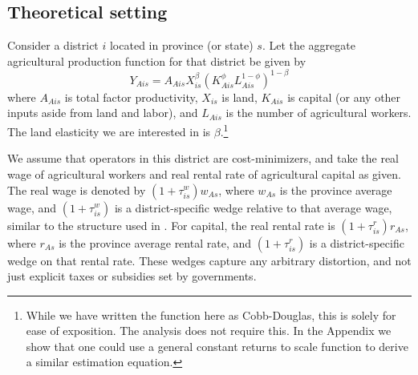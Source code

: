 \subsection{Theoretical setting}
Consider a district $i$ located in province (or state) $s$. Let the aggregate agricultural production function for that district be given by
\begin{equation}
Y_{Ais} = A_{Ais} X_{is}^{\beta} \left(K_{Ais}^{\phi}L_{Ais}^{1-\phi}\right)^{1-\beta} \label{EQ_production}
\end{equation}
where $A_{Ais}$ is total factor productivity, $X_{is}$ is land, $K_{Ais}$ is capital (or any other inputs aside from land and labor), and $L_{Ais}$ is the number of agricultural workers. The land elasticity we are interested in is $\beta$.\footnote{While we have written the function here as Cobb-Douglas, this is solely for ease of exposition. The analysis does not require this. In the Appendix we show that one could use a general constant returns to scale function to derive a similar estimation equation.}

We assume that operators in this district are cost-minimizers, and take the real wage of agricultural workers and real rental rate of agricultural capital as given. The real wage is denoted by $(1+\tau^w_{is})w_{As}$, where $w_{As}$ is the province average wage, and $(1+\tau^w_{is})$ is a district-specific wedge relative to that average wage, similar to the structure used in \cite{hsieh2009misallocation}. For capital, the real rental rate is $(1+\tau^r_{is})r_{As}$, where $r_{As}$ is the province average rental rate, and $(1+\tau^r_{is})$ is a district-specific wedge on that rental rate. These wedges capture any arbitrary distortion, and not just explicit taxes or subsidies set by governments.

